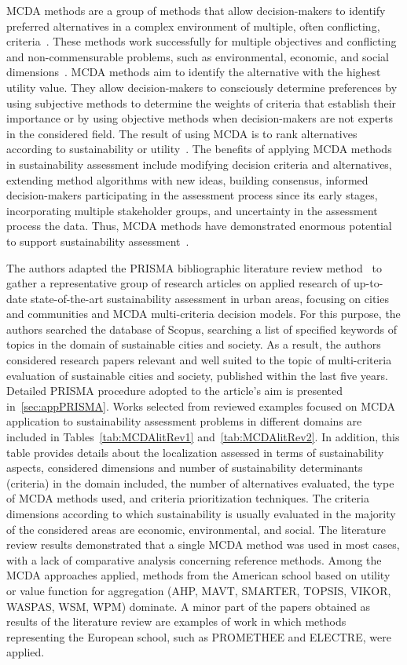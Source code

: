 \documentclass[5p,times]{elsarticle}
\newcounter{example}[section]
\begin{document}
MCDA methods are a group of methods that allow decision-makers to identify preferred alternatives in a complex environment of multiple, often conflicting, criteria~\cite{zheng2016scenario}. These methods work successfully for multiple objectives and conflicting and non-commensurable problems, such as environmental, economic, and social dimensions~\cite{trump2018sustainable}. MCDA methods aim to identify the alternative with the highest utility value. They allow decision-makers to consciously determine preferences by using subjective methods to determine the weights of criteria that establish their importance or by using objective methods when decision-makers are not experts in the considered field. The result of using MCDA is to rank alternatives according to sustainability or utility~\cite{langemeyer2016bridging}. The benefits of applying MCDA methods in sustainability assessment include modifying decision criteria and alternatives, extending method algorithms with new ideas, building consensus, informed decision-makers participating in the assessment process since its early stages, incorporating multiple stakeholder groups, and uncertainty in the assessment process the data. Thus, MCDA methods have demonstrated enormous potential to support sustainability assessment~\cite{myllyviita2017sustainability}.

The authors adapted the PRISMA bibliographic literature review method~\cite{page2021prisma} to gather a representative group of research articles on applied research of up-to-date state-of-the-art sustainability assessment in urban areas, focusing on cities and communities and MCDA multi-criteria decision models. For this purpose, the authors searched the database of Scopus, searching a list of specified keywords of topics in the domain of sustainable cities and society. As a result, the authors considered research papers relevant and well suited to the topic of multi-criteria evaluation of sustainable cities and society, published within the last five years. Detailed PRISMA procedure adopted to the article's aim is presented in~\ref{sec:appPRISMA}. Works selected from reviewed examples focused on MCDA application to sustainability assessment problems in different domains are included in Tables~\ref{tab:MCDAlitRev1} and~\ref{tab:MCDAlitRev2}. In addition, this table provides details about the localization assessed in terms of sustainability aspects, considered dimensions and number of sustainability determinants (criteria) in the domain included, the number of alternatives evaluated, the type of MCDA methods used, and criteria prioritization techniques. The criteria dimensions according to which sustainability is usually evaluated in the majority of the considered areas are economic, environmental, and social. The literature review results demonstrated that a single MCDA method was used in most cases, with a lack of comparative analysis concerning reference methods. Among the MCDA approaches applied, methods from the American school based on utility or value function for aggregation (AHP, MAVT, SMARTER, TOPSIS, VIKOR, WASPAS, WSM, WPM) dominate. A minor part of the papers obtained as results of the literature review are examples of work in which methods representing the European school, such as PROMETHEE and ELECTRE, were applied.
\end{document}
